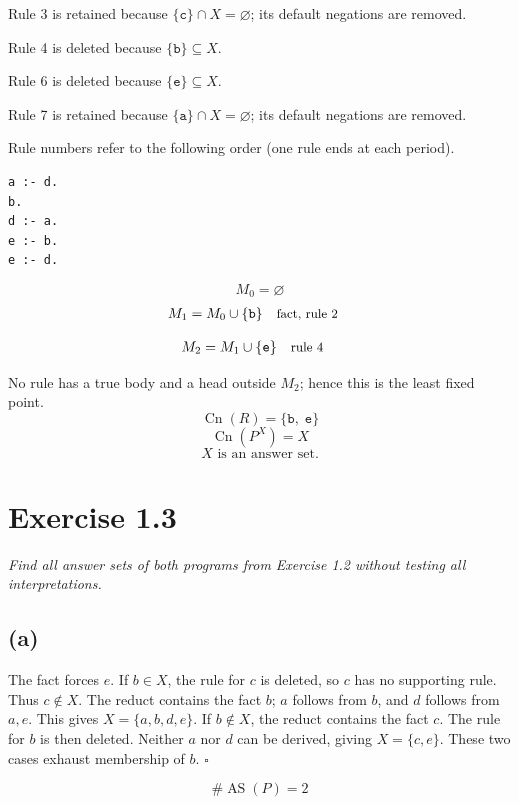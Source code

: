 \documentclass[a4paper,11pt]{article}
\newif\ifexplain
\newcommand{\explain}[1]{\ifexplain\begin{erklbox}#1\end{erklbox}\fi}
\newcommand{\why}[1]{\text{\small #1}}
\newcommand{\angabe}[1]{\textit{#1}\par}
\newcommand{\aufgabe}[1]{\section*{Exercise #1}}
\newcommand{\teil}[1]{\subsection*{(#1)}}
\newcommand{\at}[1]{\texttt{#1}}
\begin{document}
Rule 3 is retained because $\{\at{c}\}\cap X=\varnothing$; its default negations are removed.

Rule 4 is deleted because $\{\at{b}\}\subseteq X$.

Rule 6 is deleted because $\{\at{e}\}\subseteq X$.

Rule 7 is retained because $\{\at{a}\}\cap X=\varnothing$; its default negations are removed.

Rule numbers refer to the following order (one rule ends at each period).
\begin{small}
\begin{verbatim}
a :- d.
b.
d :- a.
e :- b.
e :- d.
\end{verbatim}
\end{small}
\explain{Beim Redukt bleibt die Kandidatenmenge fest. Wir entscheiden zuerst, welche Regeln wegfallen. Erst danach berechnen wir aus den verbleibenden positiven Regeln die kleinste abgeschlossene Menge. Ein Modell allein reicht nicht: Diese Menge muss genau der Kandidat sein.}
\[
M_0=\varnothing
\]
\begin{align*}
M_{1} &= M_{0}\cup \{\at{b}\} && \why{fact, rule 2}
\end{align*}
\explain{Diese Regel hat keinen Körper. Ihr Kopf $\at{b}$ ist damit ein Fakt und muss in die Menge.}
\begin{align*}
M_{2} &= M_{1}\cup \{\at{e}\} && \why{rule 4}
\end{align*}
\explain{Für $\at{e}$ brauchen wir $\at{b}$. Weil diese Voraussetzungen bereits hergeleitet sind, dürfen wir den Regelkopf jetzt aufnehmen und alle bisherigen Atome behalten; bei einer fehlenden Voraussetzung würde diese Regel dagegen noch nichts beitragen.}
No rule has a true body and a head outside $M_{2}$; hence this is the least fixed point.
\[
\operatorname{Cn}(R)=\{\at{b},\;\at{e}\}
\]
\[
\operatorname{Cn}(P^X)=X
\]
\[
\boxed{X\text{ is an answer set.}}
\]
\aufgabe{1.3}
\angabe{Find all answer sets of both programs from Exercise 1.2 without testing all interpretations.}
\teil{a}
\explain{Hier wird kein neues Programm eingeführt: Für 1.3a verwenden wir genau den Code aus 1.2a, für 1.3b den aus 1.2b. Jetzt suchen wir alle Answer Sets statt nur die vorgegebenen Kandidaten zu prüfen. Die Fallunterscheidung nach $b$ deckt alle Möglichkeiten ab.}
The fact forces $e$. If $b\in X$, the rule for $c$ is deleted, so $c$ has no supporting rule. Thus $c\notin X$. The reduct contains the fact $b$; $a$ follows from $b$, and $d$ follows from $a,e$. This gives $X=\{a,b,d,e\}$. If $b\notin X$, the reduct contains the fact $c$. The rule for $b$ is then deleted. Neither $a$ nor $d$ can be derived, giving $X=\{c,e\}$. These two cases exhaust membership of $b$. $\square$
\explain{Wir teilen nur nach Atomen auf, die eine echte Entscheidung durch Default-Negation auslösen. Danach erzwingen Fakten und Regeln den Rest. Ein positiver Kreis begründet sich nicht selbst: Ohne Startregel bleibt er beim Aufbau der kleinsten Menge leer.}
\[
\boxed{\#\operatorname{AS}(P)=2}
\]
\end{document}
